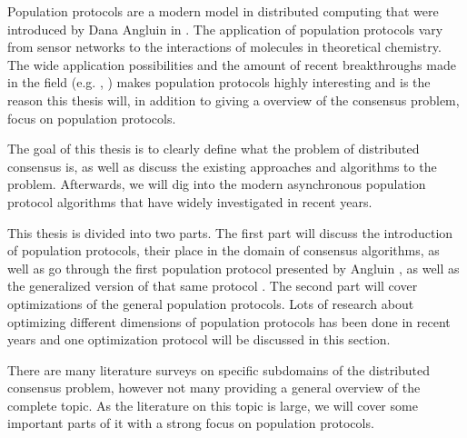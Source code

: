Population protocols are a modern model in distributed computing that were introduced by Dana Angluin in \cite{angluinComputationNetworksPassively2006}. The application of population protocols vary from sensor networks to the interactions of molecules in theoretical chemistry. \cite{aspnesIntroductionPopulationProtocols2009} The wide application possibilities and the amount of recent breakthroughs made in the field (e.g. \cite{dotyTimeSpaceOptimal2022}, \cite{bankhamerPopulationProtocolsExact2022}) makes population protocols highly interesting and is the reason this thesis will, in addition to giving a overview of the consensus problem, focus on population protocols.

The goal of this thesis is to clearly define what the problem of distributed consensus is, as well as discuss the existing approaches and algorithms to the problem. Afterwards, we will dig into the modern asynchronous population protocol algorithms that have widely investigated in recent years. 

This thesis is divided into two parts. The first part will discuss the introduction of population protocols, their place in the domain of consensus algorithms, as well as go through the first population protocol presented by Angluin \cite{angluinSimplePopulationProtocol2008}, as well as the generalized version of that same protocol \cite{AspnesFastConverganceOfKOpinion2023}. The second part will cover optimizations of the general population protocols. Lots of research about optimizing different dimensions of population protocols has been done in recent years and one optimization protocol will be discussed in this section. 

There are many literature surveys on specific subdomains of the distributed consensus problem, however not many providing a general overview of the complete topic. As the literature on this topic is large, we will cover some important parts of it with a strong focus on population protocols.
